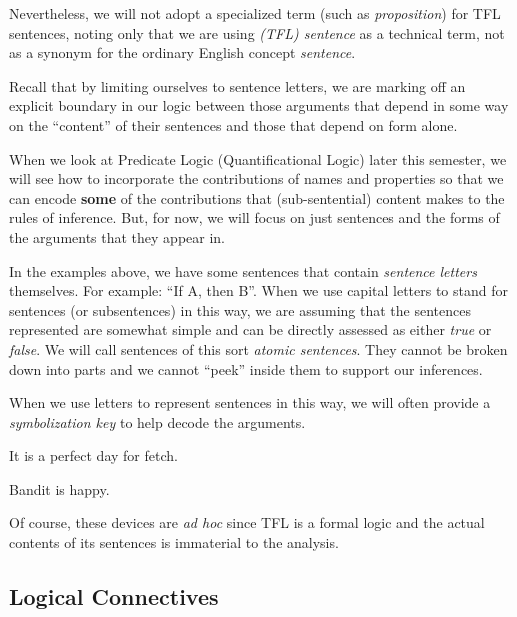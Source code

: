 Nevertheless, we will not adopt a specialized term (such as \emph{proposition})
for TFL sentences, noting only that we are using \emph{(TFL) sentence} as a
technical term, not as a synonym for the ordinary English concept
\emph{sentence}.

Recall that by limiting ourselves to sentence letters, we are marking off an
explicit boundary in our logic between those arguments that depend in some
way on the ``content'' of their sentences and those that depend on form alone.

When we look at Predicate Logic (Quantificational Logic) later this semester,
we will see how to incorporate the contributions of names and properties so
that we can encode \textbf{some} of the contributions that (sub-sentential)
content makes to the rules of inference. But, for now, we will focus on just
sentences and the forms of the arguments that they appear in.


In the examples above, we have some sentences that contain \emph{sentence
letters} themselves. For example: ``If A, then B''. When we use capital
letters to stand for sentences (or subsentences) in this way, we are assuming
that the sentences represented are somewhat simple and can be directly assessed
as either \emph{true} or \emph{false}. We will call sentences of this sort
\emph{atomic sentences}. They cannot be broken down into parts and we cannot
``peek'' inside them to support our inferences.

When we use letters to represent sentences in this way, we will often provide a
\emph{symbolization key} to help decode the arguments.

\begin{argument}
\item[A:] It is a perfect day for fetch. 
\item[C:] Bandit is happy.
\end{argument}

Of course, these devices are \emph{ad hoc} since TFL is a formal logic and
the actual contents of its sentences is immaterial to the analysis.

\subsection{Logical Connectives}

